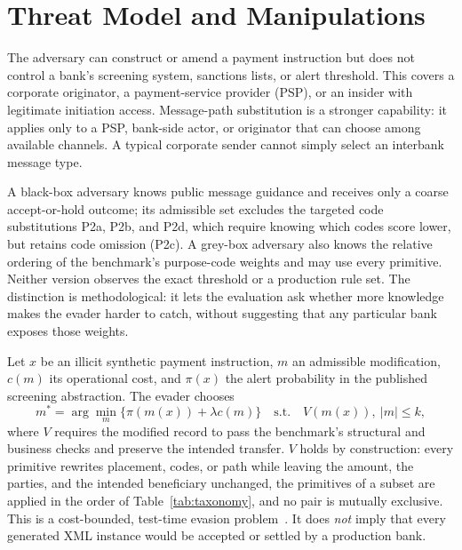 \documentclass[conference]{IEEEtran}
\begin{document}
\section{Threat Model and Manipulations}
The adversary can construct or amend a payment instruction but does not control
a bank's screening system, sanctions lists, or alert threshold. This covers a
corporate originator, a payment-service provider (PSP), or an insider with
legitimate initiation access. Message-path substitution is a stronger
capability: it applies only to a PSP, bank-side actor, or originator that can
choose among available channels. A typical corporate sender cannot simply
select an interbank message type.

A black-box adversary knows public message guidance and receives only a coarse
accept-or-hold outcome; its admissible set excludes the targeted code
substitutions P2a, P2b, and P2d, which require knowing which codes score
lower, but retains code omission (P2c). A grey-box adversary also knows the
relative ordering of the benchmark's purpose-code weights and may use every
primitive. Neither version observes the exact threshold or a production rule
set. The distinction is methodological: it lets the evaluation ask whether
more knowledge makes the evader harder to catch, without suggesting that any
particular bank exposes those weights.

Let $x$ be an illicit synthetic payment instruction, $m$ an admissible
modification, $c(m)$ its operational cost, and $\pi(x)$ the alert probability
in the published screening abstraction. The evader chooses
\begin{equation}
 m^*=\arg\min_m\{\pi(m(x))+\lambda c(m)\}
 \quad\text{s.t.}\quad V(m(x)),\ |m|\leq k,
 \label{eq:evader}
\end{equation}
where $V$ requires the modified record to pass the benchmark's structural and
business checks and preserve the intended transfer. $V$ holds by construction:
every primitive rewrites placement, codes, or path while leaving the amount,
the parties, and the intended beneficiary unchanged, the primitives of a subset
are applied in the order of Table~\ref{tab:taxonomy}, and no pair is mutually
exclusive. This is a cost-bounded,
test-time evasion problem~\cite{bruckner2011,biggio2013}. It does \emph{not}
imply that every generated XML instance would be accepted or settled by a
production bank.
\end{document}

